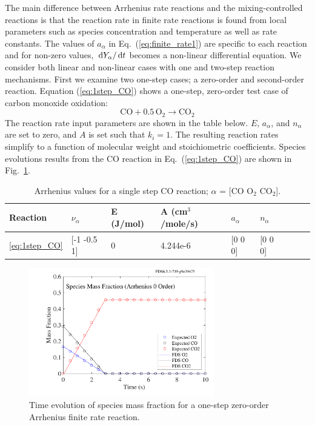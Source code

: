 \documentclass[11pt]{book}
\begin{document}
The main difference between Arrhenius rate reactions and the mixing-controlled reactions is that the reaction rate in finite rate reactions is found from local parameters such as species concentration and temperature as well as rate constants. The values of $a_{\alpha}$ in Eq.~(\ref{eq:finite_rate1}) are specific to each reaction and for non-zero values, $\,\mathrm{d} Y_{\alpha}/ \,\mathrm{d} t$ becomes  a non-linear differential equation. We consider both linear and non-linear cases with one and two-step reaction mechanisms. First we examine two one-step cases; a zero-order and second-order reaction. Equation (\ref{eq:1step_CO}) shows a one-step, zero-order test case of carbon monoxide oxidation:
\begin{equation}\label{eq:1step_CO}
\mathrm{CO+0.5 \, O_2 \rightarrow  CO_2}
\end{equation}
The reaction rate input parameters are shown in the table below. $E$, $a_{\alpha}$, and $n_{\alpha}$ are set to zero, and $A$ is set such that ${k}_{i} = 1$. The resulting reaction rates simplify to a function of molecular weight and stoichiometric coefficients. Species evolutions results from the CO reaction in Eq.~(\ref{eq:1step_CO}) are shown in Fig.~\ref{fig:Arrhenius_0Order_1step}.
\begin{table}[ht]
\begin{center}
\caption[Arrhenius values for a single step CO reaction]{Arrhenius values for a single step CO reaction; $\alpha$ = [$\mathrm{CO}$ $\mathrm{O_2}$ $\mathrm{CO_2}$].}
\label{single_step_co}
\begin{tabular}{|l|l|l|l|l|l|l|l|l|}
\hline Reaction & $\nu_{\alpha}$ & E (J/mol) & A (cm$^3$/mole/s) & $a_{\alpha}$ & $n_{\alpha}$  \\ \hline \hline
\ref{eq:1step_CO} & [-1 -0.5 1] & 0 & 4.244e-6 & [0 0 0] & [0 0 0] \\ \hline
\end{tabular}
\end{center}
\end{table}
\begin{figure}[h!]
\centering
\includegraphics[height=2.2in]{SCRIPT_FIGURES/reactionrate_arrhenius_0order_1step}
\caption[Species evolution in a 0-order 1-step finite rate reaction]{Time evolution of species mass fraction for a one-step zero-order Arrhenius finite rate reaction.}
\label{fig:Arrhenius_0Order_1step}
\end{figure}
\end{document}
